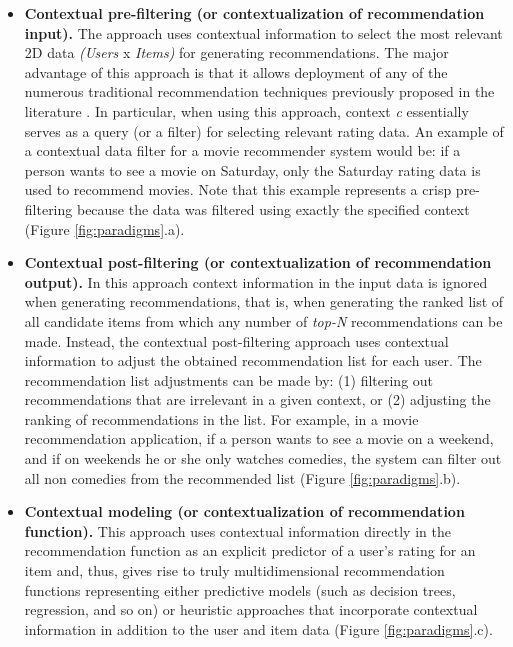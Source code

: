 \begin{itemize}
\item \textbf{Contextual pre-filtering (or contextualization of
recommendation input).} The approach uses contextual information to
select the most relevant 2D data \textit{(Users} x \textit{Items)} for generating
recommendations. The major advantage of this approach is that it
allows deployment of any of the numerous traditional recommendation
techniques previously proposed in the 
literature  \cite{adomavicius2005toward}.
In particular, when using this approach, context \textit{c} essentially 
serves as a query (or a filter) for selecting relevant rating data. 
An example of a contextual data filter for a
movie recommender system would be: if a person wants to see a movie on
Saturday, only the Saturday rating data is used to recommend movies.
Note that this example represents a crisp pre-filtering because the data
was filtered using exactly the specified context (Figure \ref{fig:paradigms}.a).
\item \textbf{Contextual post-filtering (or contextualization of
recommendation output).} In this approach context information
in the input data is ignored when generating recommendations, that is, when
generating the ranked list of all candidate items from which any
number of \textit{top-N} recommendations can be made. Instead,  the
contextual post-filtering approach uses contextual information to
adjust the obtained recommendation list for each user. The
recommendation list adjustments can be made by: (1) filtering out
recommendations that are irrelevant in a given context, or (2)
adjusting the ranking of recommendations in the list. For example, in
a movie recommendation application, if a person wants to see a movie
on a weekend, and if on weekends he or she only watches comedies, the
system can filter out all non comedies from the recommended list
(Figure  \ref{fig:paradigms}.b).
\item \textbf{Contextual modeling (or contextualization of
recommendation function).} This approach uses contextual information
directly in the recommendation function as an explicit predictor of a
user's rating for an item and, thus, gives rise to truly
multidimensional recommendation functions representing either
predictive models (such as decision trees, regression, and so on) or
heuristic approaches that incorporate contextual information in
addition to the user and item data (Figure  \ref{fig:paradigms}.c).
\end{itemize}
